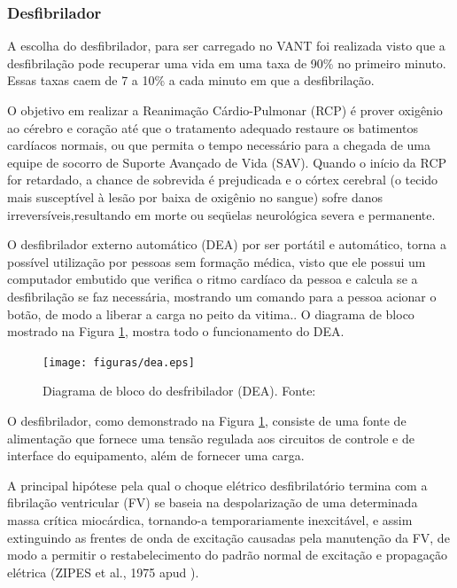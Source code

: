 \subsubsection{Desfibrilador}

A escolha do desfibrilador, para ser carregado no VANT foi realizada visto que a desfibrilação pode recuperar uma vida
em uma taxa de 90\% no primeiro minuto. Essas taxas caem de 7 a 10\% a cada minuto em que a desfibrilação. \cite{1}

O objetivo em realizar a Reanimação Cárdio-Pulmonar (RCP) é prover oxigênio ao cérebro e coração até que
o tratamento adequado restaure os batimentos cardíacos normais, ou que permita o tempo necessário para a 
chegada de uma equipe de socorro de Suporte Avançado de Vida (SAV). Quando o início da RCP for retardado, 
a chance de sobrevida é prejudicada e o córtex cerebral (o tecido mais susceptível à lesão por baixa de 
oxigênio no sangue) sofre danos irreversíveis,resultando em morte ou seqüelas neurológica severa e permanente. \cite{2}

O desfibrilador externo automático (DEA) por ser portátil e automático, torna a possível utilização por 
pessoas sem formação médica, visto que ele possui um computador embutido que verifica o ritmo cardíaco da 
pessoa e calcula se a desfibrilação se faz necessária, mostrando um comando para a pessoa acionar o botão, de 
modo a liberar a carga no peito da vitima.\cite{3}. O diagrama de bloco mostrado na Figura \ref{fig:dea}, mostra todo o funcionamento do DEA.

\begin{figure}[!h]
	\centering
	  \texttt{[image: figuras/dea.eps]}
	\caption{Diagrama de bloco do desfribilador (DEA). Fonte: \cite{bloco}}
	\label{fig:dea}
\end{figure}

O desfibrilador, como demonstrado na Figura \ref{fig:dea}, consiste de uma fonte  de alimentação que 
fornece uma tensão regulada aos circuitos de controle e de interface do equipamento, além de fornecer uma carga.

A principal hipótese pela qual o choque elétrico desfibrilatório termina com a fibrilação ventricular (FV) se
baseia na despolarização de uma determinada massa crítica miocárdica, tornando-a temporariamente inexcitável, e
assim extinguindo as frentes de onda de excitação causadas pela manutenção da FV, de modo a permitir o 
restabelecimento do padrão normal de excitação e propagação elétrica (ZIPES et al., 1975 apud ).

